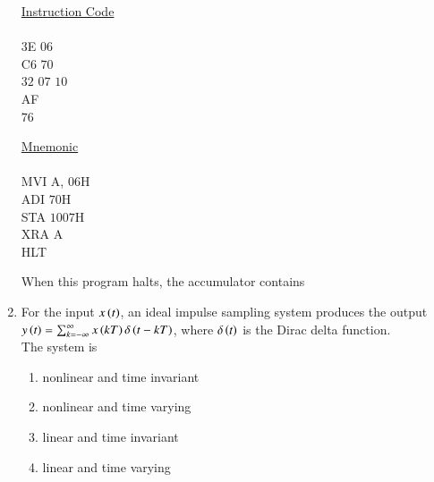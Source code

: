 \documentclass[journal,12pt,onecolumn]{IEEEtran}
\theoremstyle{remark}
\begin{document}
\begin{enumerate}
\begin{multicols}{3}
    \columnbreak
    
    \underline{Instruction Code}\\\\
    $3$E $06$\\
    C$6$ $70$\\
    $32$ $07$ $10$\\
    AF\\
    $76$
    
    \columnbreak
    
    \underline{Mnemonic}\\\\
    MVI   A, $06$H\\
    ADI   $70$H\\
    STA   $1007$H\\
    XRA   A\\
    HLT\\   
\end{multicols}
 When this program halts, the accumulator contains \par \hfill{}
\begin{enumerate}
\end{enumerate} 

 

\item For the input $x\left(t\right)$, an ideal impulse sampling system produces the output\\ $y\left(t\right)=\sum_{k=-\infty}^{\infty}x\left(kT\right)\delta\left(t-kT\right)$, where $\delta\left(t\right)$ is the Dirac delta function.\\ The system is \par  \hfill{}
    \begin{enumerate}
        \item nonlinear and time invariant
        \item nonlinear and time varying
        \item linear and time invariant
        \item linear and time varying
\end{enumerate} 

 


\end{enumerate}
\end{document}
